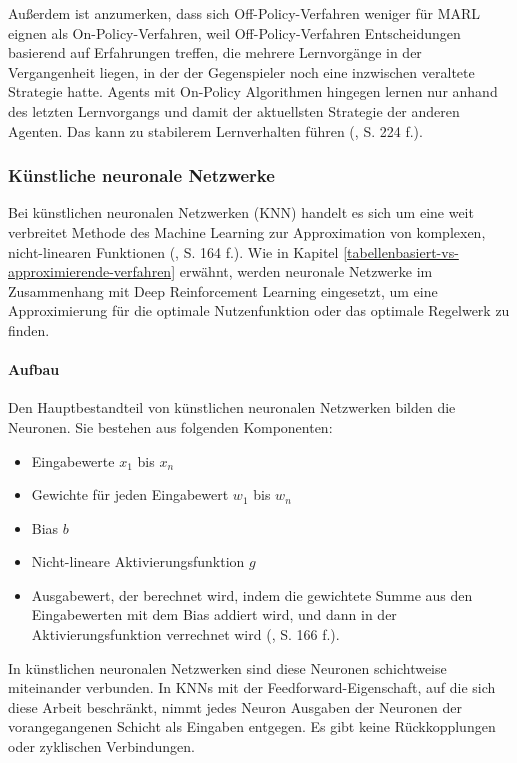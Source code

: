 Außerdem ist anzumerken, dass sich Off-Policy-Verfahren weniger für MARL eignen als On-Policy-Verfahren, weil Off-Policy-Verfahren Entscheidungen basierend auf Erfahrungen treffen, die mehrere Lernvorgänge in der Vergangenheit liegen, in der der Gegenspieler noch eine inzwischen veraltete Strategie hatte. Agents mit On-Policy Algorithmen hingegen lernen nur anhand des letzten Lernvorgangs und damit der aktuellsten Strategie der anderen Agenten. Das kann zu stabilerem Lernverhalten führen (\cite{Albrecht.2024}, S. 224 f.).

\subsubsection{Künstliche neuronale Netzwerke}

\label{kuenstliche-neuronale-netzwerke}

Bei künstlichen neuronalen Netzwerken (KNN) handelt es sich um eine weit verbreitet Methode des Machine Learning zur Approximation von komplexen, nicht-linearen Funktionen (\cite{Albrecht.2024}, S. 164 f.). Wie in Kapitel \ref{tabellenbasiert-vs-approximierende-verfahren} erwähnt, werden neuronale Netzwerke im Zusammenhang mit Deep Reinforcement Learning eingesetzt, um eine Approximierung für die optimale Nutzenfunktion oder das optimale Regelwerk zu finden.

\paragraph{Aufbau}

Den Hauptbestandteil von künstlichen neuronalen Netzwerken bilden die Neuronen. Sie bestehen aus folgenden Komponenten:

\begin{itemize}
	\item Eingabewerte $x_1$ bis $x_n$
	\item Gewichte für jeden Eingabewert $w_1$ bis $w_n$
	\item Bias $b$
	\item Nicht-lineare Aktivierungsfunktion $g$
	\item Ausgabewert, der berechnet wird, indem die gewichtete Summe aus den Eingabewerten mit dem Bias addiert wird, und dann in der Aktivierungsfunktion verrechnet wird (\cite{Albrecht.2024}, S. 166 f.).
\end{itemize}

In künstlichen neuronalen Netzwerken sind diese Neuronen schichtweise miteinander verbunden. In KNNs mit der Feedforward-Eigenschaft, auf die sich diese Arbeit beschränkt, nimmt jedes Neuron Ausgaben der Neuronen der vorangegangenen Schicht als Eingaben entgegen. Es gibt keine Rückkopplungen oder zyklischen Verbindungen.

